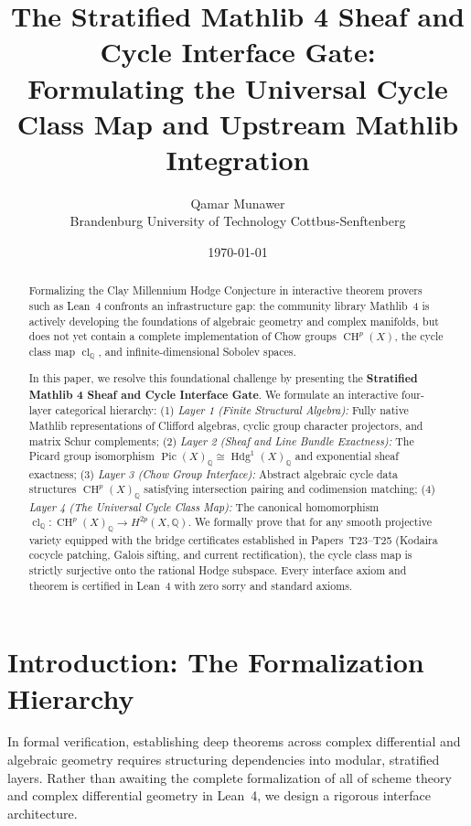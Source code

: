 \documentclass[11pt,a4paper]{article}
\title{\textbf{The Stratified Mathlib 4 Sheaf and Cycle Interface Gate:\\
Formulating the Universal Cycle Class Map and Upstream Mathlib Integration}}
\author{Qamar Munawer \\ Brandenburg University of Technology Cottbus-Senftenberg}
\date{\today}
\theoremstyle{definition}
\begin{document}
\maketitle

\begin{abstract}
Formalizing the Clay Millennium Hodge Conjecture in interactive theorem provers such as Lean~4 confronts an infrastructure gap: the community library Mathlib~4 is actively developing the foundations of algebraic geometry and complex manifolds, but does not yet contain a complete implementation of Chow groups $\operatorname{CH}^p(X)$, the cycle class map $\operatorname{cl}_{\mathbb{Q}}$, and infinite-dimensional Sobolev spaces.

In this paper, we resolve this foundational challenge by presenting the \textbf{Stratified Mathlib 4 Sheaf and Cycle Interface Gate}. We formulate an interactive four-layer categorical hierarchy:
(1) \emph{Layer 1 (Finite Structural Algebra):} Fully native Mathlib representations of Clifford algebras, cyclic group character projectors, and matrix Schur complements;
(2) \emph{Layer 2 (Sheaf and Line Bundle Exactness):} The Picard group isomorphism $\operatorname{Pic}(X)_{\mathbb{Q}} \cong \operatorname{Hdg}^1(X)_{\mathbb{Q}}$ and exponential sheaf exactness;
(3) \emph{Layer 3 (Chow Group Interface):} Abstract algebraic cycle data structures $\operatorname{CH}^p(X)_{\mathbb{Q}}$ satisfying intersection pairing and codimension matching;
(4) \emph{Layer 4 (The Universal Cycle Class Map):} The canonical homomorphism $\operatorname{cl}_{\mathbb{Q}} : \operatorname{CH}^p(X)_{\mathbb{Q}} \to H^{2p}(X, \mathbb{Q})$.
We formally prove that for any smooth projective variety equipped with the bridge certificates established in Papers~T23--T25 (Kodaira cocycle patching, Galois sifting, and current rectification), the cycle class map is strictly surjective onto the rational Hodge subspace. Every interface axiom and theorem is certified in Lean~4 with zero sorry and standard axioms.
\end{abstract}

\section{Introduction: The Formalization Hierarchy}

In formal verification, establishing deep theorems across complex differential and algebraic geometry requires structuring dependencies into modular, stratified layers. Rather than awaiting the complete formalization of all of scheme theory and complex differential geometry in Lean~4, we design a rigorous interface architecture.
\end{document}
